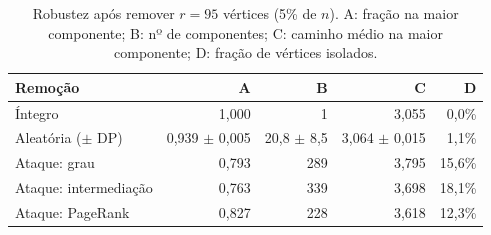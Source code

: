 \begin{table}
  \caption{Robustez após remover $r=95$ vértices (5\% de $n$). A: fração na maior componente; B: nº de componentes; C: caminho médio na maior componente; D: fração de vértices isolados.}
  \label{tab:robustez}
  \small
  \begin{tabular}{lrrrr}
    \toprule
    Remoção & A & B & C & D \\
    \midrule
    Íntegro & 1,000 & 1 & 3,055 & 0,0\% \\
    Aleatória ($\pm$ DP) & 0,939 $\pm$ 0,005 & 20,8 $\pm$ 8,5 & 3,064 $\pm$ 0,015 & 1,1\% \\
    Ataque: grau & 0,793 & 289 & 3,795 & 15,6\% \\
    Ataque: intermediação & 0,763 & 339 & 3,698 & 18,1\% \\
    Ataque: PageRank & 0,827 & 228 & 3,618 & 12,3\% \\
    \bottomrule
  \end{tabular}
\end{table}
